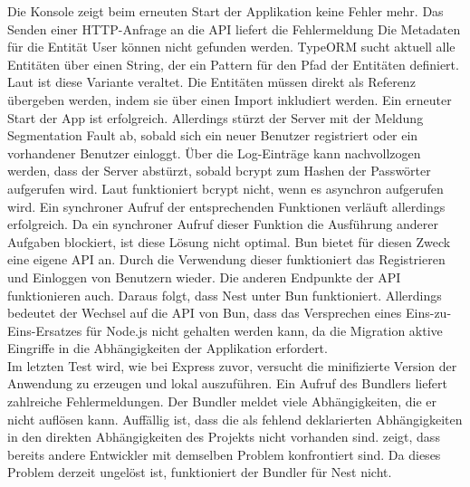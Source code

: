 \noindent
Die Konsole zeigt beim erneuten Start der Applikation keine Fehler mehr. Das Senden einer HTTP-Anfrage an die API liefert die Fehlermeldung \glq Die Metadaten für die Entität User können nicht gefunden werden\grq{}. TypeORM sucht aktuell alle Entitäten über einen String, der ein Pattern für den Pfad der Entitäten definiert. Laut \cite{TypeORM.2021} ist diese Variante veraltet. Die Entitäten müssen direkt als Referenz übergeben werden, indem sie über einen Import inkludiert werden. \newline
Ein erneuter Start der App ist erfolgreich. Allerdings stürzt der Server mit der Meldung \glq Segmentation Fault\grq{} ab, sobald sich ein neuer Benutzer registriert oder ein vorhandener Benutzer einloggt. Über die Log-Einträge kann nachvollzogen werden, dass der Server abstürzt, sobald \glq bcrypt\grq{} zum Hashen der Passwörter aufgerufen wird. Laut \cite{Sumner.2023} funktioniert \glq bcrypt\grq{} nicht, wenn es asynchron aufgerufen wird. Ein synchroner Aufruf der entsprechenden Funktionen verläuft allerdings erfolgreich. Da ein synchroner Aufruf dieser Funktion die Ausführung anderer Aufgaben blockiert, ist diese Lösung nicht optimal. Bun bietet für diesen Zweck eine eigene API an. Durch die Verwendung dieser funktioniert das Registrieren und Einloggen von Benutzern wieder. Die anderen Endpunkte der API funktionieren auch. Daraus folgt, dass Nest unter Bun funktioniert. Allerdings bedeutet der Wechsel auf die API von Bun, dass das Versprechen eines Eins-zu-Eins-Ersatzes für Node.js nicht gehalten werden kann, da die Migration aktive Eingriffe in die Abhängigkeiten der Applikation erfordert.\\

\noindent
Im letzten Test wird, wie bei Express zuvor, versucht die minifizierte Version der Anwendung zu erzeugen und lokal auszuführen. Ein Aufruf des Bundlers liefert zahlreiche Fehlermeldungen. Der Bundler meldet viele Abhängigkeiten, die er nicht auflösen kann. Auffällig ist, dass die als fehlend deklarierten Abhängigkeiten in den direkten Abhängigkeiten des Projekts nicht vorhanden sind. \cite{Postek.2023} zeigt, dass bereits andere Entwickler mit demselben Problem konfrontiert sind. Da dieses Problem derzeit ungelöst ist, funktioniert der Bundler für Nest nicht.

